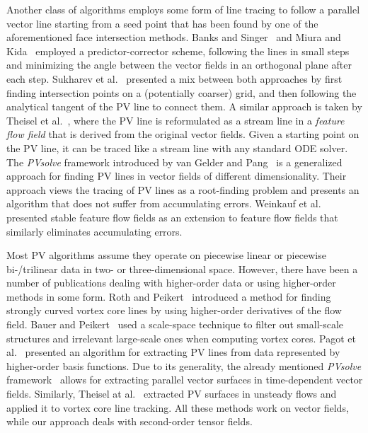 %
Another class of algorithms employs some form of line tracing to follow a
parallel vector line starting from a seed point that has been found by one of
the aforementioned face intersection methods.
%
Banks and Singer~\cite{Banks1995} and Miura and Kida~\cite{Miura1997} employed a
predictor-corrector scheme, following the lines in small steps and minimizing
the angle between the vector fields in an orthogonal plane after each step.
%
Sukharev et al.~\cite{Sukharev2006} presented a mix between both approaches by
first finding intersection points on a (potentially coarser) grid, and then
following the analytical tangent of the \ac{PV} line to connect them.
%
A similar approach is taken by Theisel et al.~\cite{Theisel2003a}, where the
\ac{PV} line is reformulated as a stream line in a {\em feature flow field} that is
derived from the original vector fields.
%
Given a starting point on the \ac{PV} line, it can be traced like a stream line with
any standard ODE solver.
%
The \emph{PVsolve} framework introduced by van Gelder and Pang~\cite{Gelder2009}
is a generalized approach for finding \ac{PV} lines in vector fields of different
dimensionality.
%
Their approach views the tracing of \ac{PV} lines as a root-finding problem and
presents an algorithm that does not suffer from accumulating errors.
%
Weinkauf et al.~\cite{Weinkauf2010a} presented stable feature flow fields as an
extension to feature flow fields that similarly eliminates accumulating errors.
%

%
Most \ac{PV} algorithms assume they operate on piecewise linear or piecewise
bi-/trilinear data in two- or three-dimensional space.
%
However, there have been a number of publications dealing with higher-order data
or using higher-order methods in some form.
%
Roth and Peikert~\cite{Roth1998} introduced a method for finding strongly curved
vortex core lines by using higher-order derivatives of the flow field.
%
Bauer and Peikert~\cite{Bauer2002} used a scale-space technique to filter out
small-scale structures and irrelevant large-scale ones when computing vortex
cores.
%
Pagot et al.~\cite{Pagot2011} presented an algorithm for extracting \ac{PV} lines
from data represented by higher-order basis functions.
%
Due to its generality, the already mentioned \emph{PVsolve}
framework~\cite{Gelder2009} allows for extracting parallel vector surfaces in
time-dependent vector fields.
%
Similarly, Theisel at al.~\cite{Theisel2005} extracted \ac{PV} surfaces in unsteady
flows and applied it to vortex core line tracking.
%
All these methods work on vector fields, while our approach deals with
second-order tensor fields.
%

